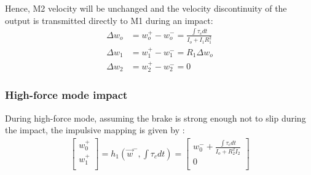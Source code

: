 %
Hence, M2 velocity will be unchanged and the velocity discontinuity of the output is transmitted directly to M1 during an impact:
%
\begin{align}
\Delta w_o  &= w_o^+ - w_o^- = \frac{ \int{\tau_c dt} }{ I_o + I_1 R_1^2}  \\
\Delta w_1  &= w_1^+ - w_1^- = R_1 \Delta w_o \\
\Delta w_2  &= w_2^+ - w_2^- =  0
\label{eq:dsdm_impact_gen_delta_w1}
\end{align}


\subsubsection{High-force mode impact}

During high-force mode, assuming the brake is strong enough not to slip during the impact, the impulsive mapping is given by :
%
\begin{align}
\left[
\begin{array}{c}
w_0^+ \\
w_1^+ \\
\end{array}
\right] = h_1( \vec{w}^- , \int \tau_c dt ) = 
\left[
\begin{array}{c}
w_0^- + \frac{\int{\tau_c dt}}{I_o + R_2^2  I_2 } \\
0 \\
\end{array}
\right]  
\end{align}


